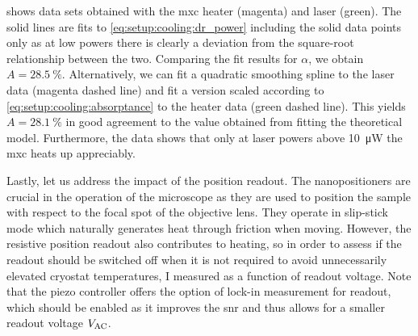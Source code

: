  shows data sets obtained with the \gls{mxc} heater (magenta) and laser (green).
The solid lines are fits to \cref{eq:setup:cooling:dr_power} including the solid data points only as at low powers there is clearly a deviation from the square-root relationship between the two.
Comparing the fit results for $\alpha$, we obtain $A = \qty{28.5}{\percent}$.
Alternatively, we can fit a quadratic smoothing spline to the laser data (magenta dashed line) and fit a version scaled according to \cref{eq:setup:cooling:absorptance} to the heater data (green dashed line).
This yields $A = \qty{28.1}{\percent}$ in good agreement to the value obtained from fitting the theoretical model.
Furthermore, the data shows that only at laser powers above \qty{10}{\micro\watt} the \gls{mxc} heats up appreciably.

Lastly, let us address the impact of the \positioner position readout.
The nanopositioners are crucial in the operation of the microscope as they are used to position the sample with respect to the focal spot of the objective lens.
They operate in slip-stick mode which naturally generates heat through friction when moving.
However, the resistive position readout also contributes to heating, so in order to assess if the readout should be switched off when it is not required to avoid unnecessarily elevated cryostat temperatures, I measured \Tmxc as a function of readout voltage.
Note that the \positionercontroller piezo controller offers the option of lock-in measurement for readout, which should be enabled as it improves the \gls{snr} and thus allows for a smaller readout voltage $V_{\mathrm{AC}}$.

